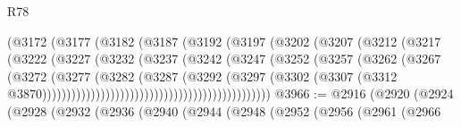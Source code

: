 \begin{lexlean}{R78}
\begin{coremodule}
                                        (@3172
                                          (@3177
                                            (@3182
                                              (@3187
                                                (@3192
                                                  (@3197
                                                    (@3202
                                                      (@3207
                                                        (@3212
                                                          (@3217
                                                            (@3222
                                                              (@3227
                                                                (@3232
                                                                  (@3237
                                                                    (@3242
                                                                      (@3247
                                                                        (@3252
                                                                          (@3257
                                                                            (@3262
                                                                              (@3267
                                                                                (@3272
                                                                                  (@3277
                                                                                    (@3282
                                                                                      (@3287
                                                                                        (@3292
                                                                                          (@3297
                                                                                            (@3302
                                                                                              (@3307
                                                                                                (@3312
                                                                                                  @3870)))))))))))))))))))))))))))))))))))))))))))))))
@3966 := @2916
    (@2920
      (@2924
        (@2928
          (@2932
            (@2936
              (@2940
                (@2944
                  (@2948
                    (@2952
                      (@2956
                        (@2961
                          (@2966

\end{coremodule}
\end{lexlean}
